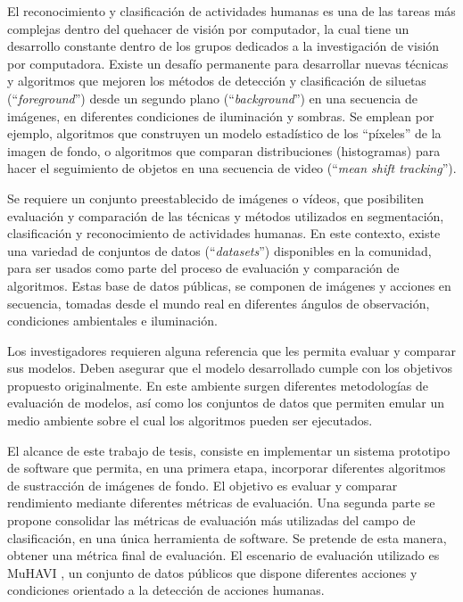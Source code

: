 \indent El reconocimiento y clasificación de actividades humanas es una de las tareas más complejas dentro del quehacer de visión por computador, la cual tiene un desarrollo constante dentro de los grupos dedicados a la investigación de visión por computadora. Existe un desafío permanente para desarrollar nuevas técnicas y algoritmos que mejoren los métodos de detección y clasificación de siluetas (``\textit{foreground}'') desde un segundo plano (``\textit{background}'') en una secuencia de imágenes, en diferentes condiciones de iluminación y sombras. Se emplean por ejemplo, algoritmos que construyen un modelo estadístico de los ``píxeles'' de la imagen de fondo, o algoritmos que comparan distribuciones (histogramas) para hacer el seguimiento de objetos en una secuencia de video (``\textit{mean shift tracking}''). 

\indent Se requiere un conjunto preestablecido de imágenes o vídeos, que posibiliten evaluación y comparación de las técnicas y métodos utilizados en segmentación, clasificación y reconocimiento de actividades humanas. En este contexto, existe una variedad de conjuntos de datos (``\textit{datasets}'') disponibles en la comunidad, para ser usados como parte del proceso de evaluación y comparación de algoritmos. Estas base de datos públicas, se componen de imágenes y acciones en secuencia, tomadas desde el mundo real en diferentes ángulos de observación, condiciones ambientales e iluminación.

\indent Los investigadores requieren alguna referencia que les permita evaluar y comparar sus modelos. Deben asegurar que el modelo desarrollado cumple con los objetivos propuesto originalmente. En este ambiente surgen diferentes metodologías de evaluación de modelos, así como los conjuntos de datos que permiten emular un medio ambiente sobre el cual los algoritmos pueden ser ejecutados. 

\indent El alcance de este trabajo de tesis, consiste en implementar un sistema prototipo de software que permita, en una primera etapa, incorporar diferentes algoritmos de sustracción de imágenes de fondo. El objetivo es evaluar y comparar rendimiento mediante diferentes métricas de evaluación. Una segunda parte se propone consolidar las métricas de evaluación más utilizadas del campo de clasificación, en una única herramienta de software. Se pretende de esta manera, obtener una métrica final de evaluación. El escenario de evaluación utilizado es MuHAVI \cite{singh_muhavi_2010}, un conjunto de datos públicos que dispone diferentes acciones y condiciones orientado a la detección de acciones humanas.




